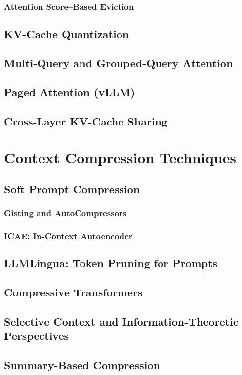\documentclass[12pt, letterpaper]{article}
\begin{document}
\subsubsection{Attention Score--Based Eviction}
\subsection{KV-Cache Quantization}
\subsection{Multi-Query and Grouped-Query Attention}
\subsection{Paged Attention (vLLM)}
\subsection{Cross-Layer KV-Cache Sharing}

\section{Context Compression Techniques}
\subsection{Soft Prompt Compression}
\subsubsection{Gisting and AutoCompressors}
\subsubsection{ICAE: In-Context Autoencoder}
\subsection{LLMLingua: Token Pruning for Prompts}
\subsection{Compressive Transformers}
\subsection{Selective Context and Information-Theoretic Perspectives}
\subsection{Summary-Based Compression}
\end{document}
